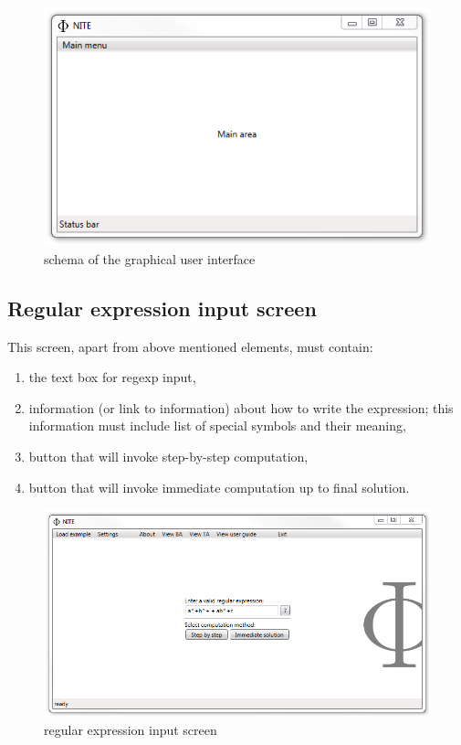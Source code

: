 \documentclass{article}
\begin{document}
\begin{figure}[ht!]
  \centering
  \includegraphics[width=.6\textwidth]{../../graphics/PhiniteGuiMockup.png}
  \caption{schema of the graphical user interface}
\end{figure}

\newpage

\subsection{Regular expression input screen}
This screen, apart from above mentioned elements, must contain:
\begin{enumerate}

  \item the text box for regexp input,

  \item information (or link to information) about how to write the expression; this information
  must include list of special symbols and their meaning,

  \item button that will invoke step-by-step computation,

  \item button that will invoke immediate computation up to final solution.

\end{enumerate}

\begin{figure}[ht!]
  \centering
  \includegraphics[width=.9\textwidth]{../../graphics/Screen1.png}
  \caption{regular expression input screen}
\end{figure}
\end{document}
